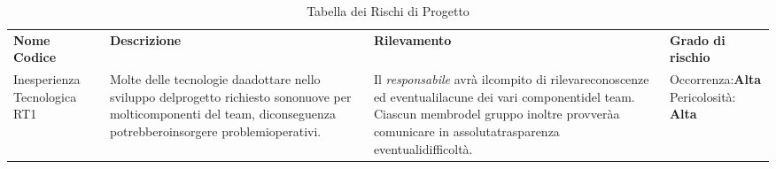 \begin{center}
    \vspace{10px}
    \begin{table}[h!]
    \centering
    \caption{Tabella dei Rischi di Progetto}
    \renewcommand{\arraystretch}{1.8}
    \begin{tabular}{p{60px} p{150px} p{150px} p{90px}}
        \rowcolor{logo!70} \acapo{\textbf{Nome}\\\textbf{Codice}} & \textbf{Descrizione} & \textbf{Rilevamento} & \textbf{Grado di  rischio}\\
        Inesperienza Tecnologica RT1 & Molte delle tecnologie daadottare nello sviluppo delprogetto richiesto sononuove per molticomponenti del team, diconseguenza potrebberoinsorgere problemioperativi. & Il \emph{responsabile} avrà ilcompito di rilevareconoscenze ed eventualilacune dei vari componentidel team. Ciascun membrodel gruppo inoltre provveràa comunicare in assolutatrasparenza eventualidifficoltà. & \acapo {Occorrenza:\textbf{Alta} \\  Pericolosità: \textbf{Alta} }\\  
    \end{tabular}
\end{table}
\end{center}
